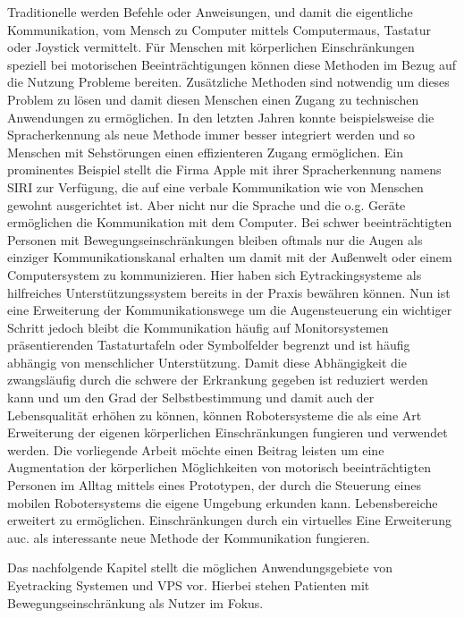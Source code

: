 Traditionelle werden Befehle oder Anweisungen, und damit die eigentliche Kommunikation, vom Mensch zu Computer mittels Computermaus, Tastatur oder Joystick vermittelt. Für Menschen mit körperlichen Einschränkungen speziell bei motorischen Beeinträchtigungen können diese Methoden im Bezug auf die Nutzung Probleme bereiten. Zusätzliche Methoden sind notwendig um dieses Problem zu lösen und damit diesen Menschen einen Zugang zu technischen Anwendungen zu ermöglichen. In den letzten Jahren konnte beispielsweise die Spracherkennung als neue Methode immer besser integriert werden und so Menschen mit Sehstörungen einen effizienteren Zugang ermöglichen. Ein prominentes Beispiel stellt die Firma Apple mit ihrer Spracherkennung namens SIRI zur Verfügung, die auf eine verbale Kommunikation wie von Menschen gewohnt ausgerichtet ist. Aber nicht nur die Sprache und die o.g. Geräte ermöglichen die Kommunikation mit dem Computer. Bei schwer beeinträchtigten Personen mit Bewegungseinschränkungen bleiben oftmals nur die Augen als einziger Kommunikationskanal erhalten um damit mit der Außenwelt oder einem Computersystem zu kommunizieren. Hier haben sich Eytrackingsysteme als hilfreiches Unterstützungssystem bereits in der Praxis bewähren können. Nun ist eine Erweiterung der Kommunikationswege um die Augensteuerung ein wichtiger Schritt jedoch bleibt die Kommunikation häufig auf Monitorsystemen präsentierenden Tastaturtafeln oder Symbolfelder begrenzt und ist häufig abhängig von menschlicher Unterstützung. Damit diese Abhängigkeit die zwangsläufig durch die schwere der Erkrankung gegeben ist reduziert werden kann und um den Grad der Selbstbestimmung und damit auch der Lebensqualität erhöhen zu können, können Robotersysteme die als eine Art Erweiterung der eigenen körperlichen Einschränkungen fungieren und verwendet werden. Die vorliegende Arbeit möchte einen Beitrag leisten um eine Augmentation der körperlichen Möglichkeiten von motorisch beeinträchtigten Personen im Alltag mittels eines Prototypen, der durch die Steuerung eines mobilen Robotersystems die eigene Umgebung erkunden kann. Lebensbereiche erweitert zu ermöglichen.  Einschränkungen durch ein virtuelles    Eine Erweiterung auc. als interessante neue Methode der Kommunikation fungieren. 

Das nachfolgende Kapitel stellt die möglichen Anwendungsgebiete von Eyetracking Systemen und VPS vor. Hierbei stehen Patienten mit Bewegungseinschränkung als Nutzer im Fokus.

